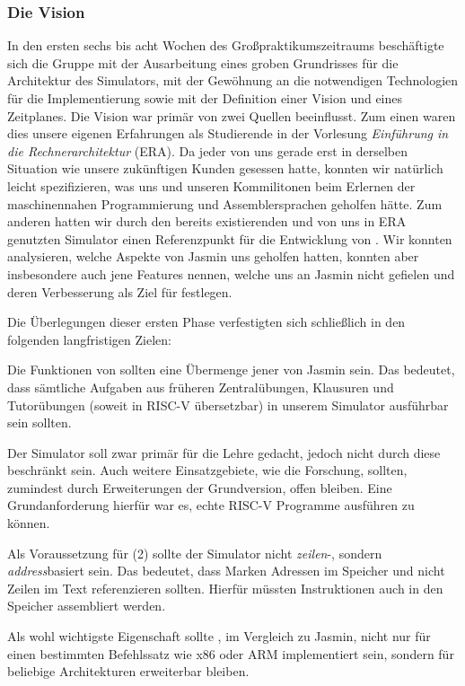 
\subsubsection{Die Vision}
\label{team:orga-plan-vision}
\vspace{-0.2cm}

In den ersten sechs bis acht Wochen des Großpraktikumszeitraums beschäftigte
sich die Gruppe mit der Ausarbeitung eines groben Grundrisses für die
Architektur des Simulators, mit der Gewöhnung an die notwendigen Technologien
für die Implementierung sowie mit der Definition einer Vision und eines
Zeitplanes. Die Vision war primär von zwei Quellen beeinflusst. Zum einen waren
dies unsere eigenen Erfahrungen als Studierende in der Vorlesung
\emph{Einführung in die Rechnerarchitektur} (ERA). Da jeder von uns gerade erst
in derselben Situation wie unsere zukünftigen Kunden gesessen hatte, konnten wir
natürlich leicht spezifizieren, was uns und unseren Kommilitonen beim Erlernen
der maschinennahen Programmierung und Assemblersprachen geholfen hätte. Zum
anderen hatten wir durch den bereits existierenden und von uns in ERA genutzten
Simulator einen Referenzpunkt für die Entwicklung von \erasim{}. Wir konnten
analysieren, welche Aspekte von Jasmin uns geholfen hatten, konnten aber
insbesondere auch jene Features nennen, welche uns an Jasmin nicht gefielen und
deren Verbesserung als Ziel für \erasim{} festlegen.

Die Überlegungen dieser ersten Phase verfestigten sich schließlich in den
folgenden langfristigen Zielen:
\begin{senumerate}{-0.45cm}
  \item Die Funktionen von \erasim{} sollten eine Übermenge jener von Jasmin
  sein. Das bedeutet, dass sämtliche Aufgaben aus früheren Zentralübungen,
  Klausuren und Tutorübungen (soweit in RISC-V übersetzbar) in unserem Simulator ausführbar sein sollten.
  \item Der Simulator soll zwar primär für die Lehre gedacht, jedoch nicht durch
  diese beschränkt sein. Auch weitere Einsatzgebiete, wie die Forschung,
  sollten, zumindest durch Erweiterungen der Grundversion, offen bleiben. Eine
  Grundanforderung hierfür war es, echte RISC-V Programme ausführen zu können.
  \item Als Voraussetzung für (2) sollte der Simulator nicht \emph{zeilen}-,
  sondern \emph{address}basiert sein. Das bedeutet, dass Marken Adressen im
  Speicher und nicht Zeilen im Text referenzieren sollten. Hierfür müssten
  Instruktionen auch in den Speicher assembliert werden.
  \item Als wohl wichtigste Eigenschaft sollte \erasim{}, im Vergleich zu
  Jasmin, nicht nur für einen bestimmten Befehlssatz wie x86 oder ARM
  implementiert sein, sondern für beliebige Architekturen erweiterbar bleiben.
  \vspace{-0.4cm}
\end{senumerate}

